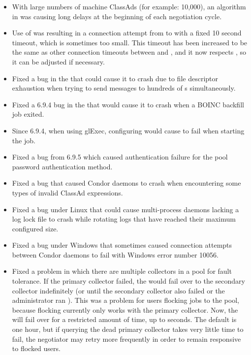 \begin{itemize}
\item With large numbers of machine ClassAds (for example: 10,000), 
  an algorithm in  was causing long delays at the 
  beginning of each negotiation cycle.

\item Use of  was resulting in a
  connection attempt from  to  with a
  fixed 10 second timeout, which is sometimes too small.  This timeout
  has been increased to be the same as other connection timeouts between
   and , and it now respects
  , so it can be adjusted if necessary.

\item Fixed a bug in the  that could cause it to crash due
  to file descriptor exhaustion when trying to send messages to hundreds of
  s simultaneously.

\item Fixed a 6.9.4 bug in the  that would cause it to crash
  when a BOINC backfill job exited.

\item Since 6.9.4, when using glExec, configuring 
  would cause  to fail when starting the job.

\item Fixed a bug from 6.9.5 which caused authentication failure for
  the pool password authentication method.

\item Fixed a bug that caused Condor daemons to crash when encountering
  some types of invalid ClassAd expressions.

\item Fixed a bug under Linux that could cause multi-process daemons
  lacking a log lock file to crash while rotating logs that have reached
  their maximum configured size.

\item Fixed a bug under Windows that sometimes caused connection attempts
  between Condor daemons to fail with Windows error number 10056.

\item Fixed a problem in which there are multiple collectors in a pool
  for fault tolerance.  If the primary collector failed, the
   would fail over to the secondary collector
  indefinitely (or until the secondary collector also failed or the
  administrator ran ).  This was a problem for users
  flocking jobs to the pool, because flocking currently only works with
  the primary collector.  Now, the  will fail over
  for a restricted amount of time, up to
   seconds.  The default
  is one hour, but if querying the dead primary collector takes very little
  time to fail, the negotiator may retry more frequently in order to remain
  responsive to flocked users.


\end{itemize}
